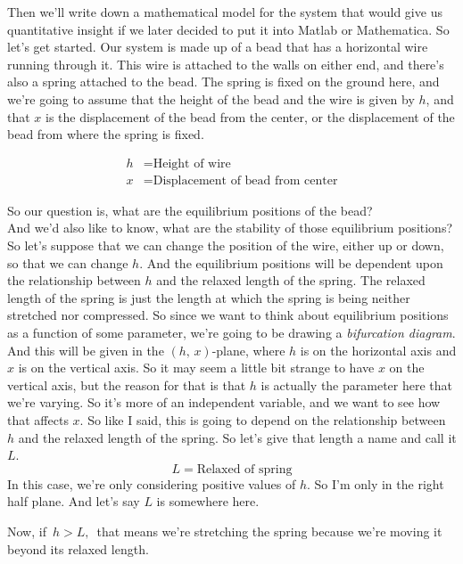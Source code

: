 Then we'll write down a mathematical model
for the system that would give us quantitative insight if we
later decided to put it into Matlab or Mathematica.
So let's get started.
Our system is made up of a bead that
has a horizontal wire running through it.
This wire is attached to the walls on either end,
and there's also a spring attached to the bead.
The spring is fixed on the ground here,
and we're going to assume that
the height of the bead and the wire is given by $h$, 
and that $x$ is the displacement of the bead from the center,
or the displacement of the bead from where the spring is fixed.

\begin{align*}
  h &= \text{Height of wire} \\
  x &= \text{Displacement of bead from center}
\end{align*}

So our question is, what are the equilibrium positions
of the bead? \\
And we'd also like to know, what are the stability
of those equilibrium positions? \\
So let's suppose that we can change
the position of the wire, either up or down, so that we can change $h$.
And the equilibrium positions will
be dependent upon the relationship between $h$ and the relaxed length of the spring.
The relaxed length of the spring is just
the length at which the spring is being neither stretched nor compressed.
So since we want to think about equilibrium positions
as a function of some parameter, we're going to be drawing a \emph{bifurcation diagram}.
And this will be given in the $(h,\,x)$-plane, where
$h$ is on the horizontal axis and $x$ is on the vertical axis.
So it may seem a little bit strange to have $x$ on the vertical axis, but the reason for that
is that $h$ is actually the parameter here that we're varying.
So it's more of an independent variable, and we want to see how that affects $x$.
So like I said, this is going to depend
on the relationship between $h$ and the relaxed length of the spring.
So let's give that length a name and call it $L$.
\begin{equation*}
  L = \text{Relaxed of spring}
\end{equation*}
In this case, we're only considering positive values of $h$.
So I'm only in the right half plane. And let's say $L$ is somewhere here.

\clearpage

Now, if $\, h > L,\,$ that means we're stretching the spring
because we're moving it beyond its relaxed length.


